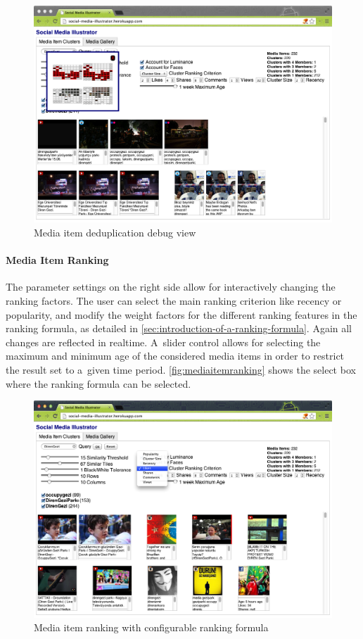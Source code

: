 \begin{figure}[!ht]
  \centering
  \includegraphics[width=1\columnwidth]{app2.png}
  \caption{Media item deduplication debug view}
  \label{fig:mediaitemdeduplication}
\end{figure}

\paragraph{Media Item Ranking}

The parameter settings on the right side 
allow for interactively changing the ranking factors.
The user can select the main ranking criterion like recency or popularity, and modify the weight factors 
for the different ranking features in the ranking formula,
as detailed in \autoref{sec:introduction-of-a-ranking-formula}.
Again all changes are reflected in realtime.
A~slider control allows for selecting the maximum 
and minimum age of the considered media items 
in order to restrict the result set to a~given time period.
\autoref{fig:mediaitemranking} shows the select box
where the ranking formula can be selected.

\begin{figure}[!ht]
  \centering
  \includegraphics[width=1\columnwidth]{app3.png}
  \caption{Media item ranking with configurable ranking formula}
  \label{fig:mediaitemranking}
\end{figure}

